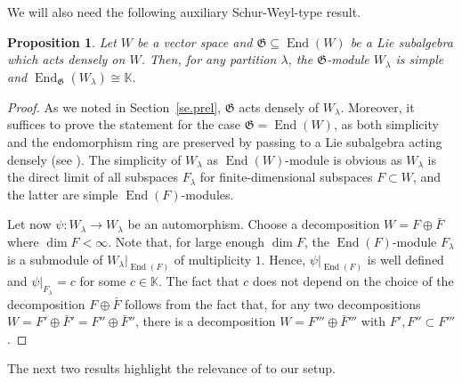 \documentclass[11pt]{article}
\theoremstyle{plain}
\newtheorem{proposition}[lemma]{Proposition}
\theoremstyle{nonumberplain}
\theoremstyle{plain}
\theoremstyle{nonumberplain}
\newtheorem{proof}{Proof}
\newcommand\bK{\mathbb K}
\newcommand\fG{\mathfrak{G}}
\DeclareMathOperator{\End}{\mathrm{End}}
\begin{document}
We will also need the following auxiliary Schur-Weyl-type result. 


\begin{proposition}\label{le.sw}
  Let $W$ be a vector space and $\fG\subseteq \End(W)$ {be} a Lie
  subalgebra { which acts} densely on $W$. Then, for any partition
  $\lambda$, the $\fG$-module $W_\lambda$ is simple and
  $\End_\fG(W_\lambda)\cong \bK$.
\end{proposition}
\begin{proof}  As we noted in Section~\ref{se.prel}, $\mathfrak{G}$ acts densely of $W_\lambda$.  Moreover, it suffices to prove the statement for the case $\mathfrak{G}=\End(W)$, as both simplicity and the endomorphism ring are
  preserved by passing to a Lie subalgebra acting densely (see
  \cite[Lemma 7.3, Theorem 7.4]{PS2}).
The simplicity of $W_\lambda$ as $\End(W)$-module is obvious as $W_\lambda$ is the direct limit of all subspaces $F_\lambda$ for finite-dimensional subspaces $F\subset W$, and the latter are simple $\End(F)$-modules.

Let now $\psi:W_\lambda\to W_\lambda$ be an automorphism.  Choose a decomposition $W=F\oplus \bar{F}$ where $\dim F<\infty$.  Note that, for large enough $\dim F$, the $\End(F)$-module $F_\lambda$ is a submodule of $W_\lambda\Big|_{\End(F)}$ of multiplicity $1$.  Hence, $\psi\big|_{\End(F)}$ is well defined and $\psi\big|_{F_\lambda}=c$ for some $c\in \bK$.  The fact that $c$ does not depend on the choice of the decomposition $F\oplus \bar{F}$ follows from the fact that, for any two decompositions $W=F'\oplus \bar{F}'=F''\oplus \bar{F}''$, there is a decomposition $W=F'''\oplus \bar{F}'''$ with $F',F''\subset F'''$.
\end{proof}




The next two results highlight the relevance of  to our setup.
\end{document}
